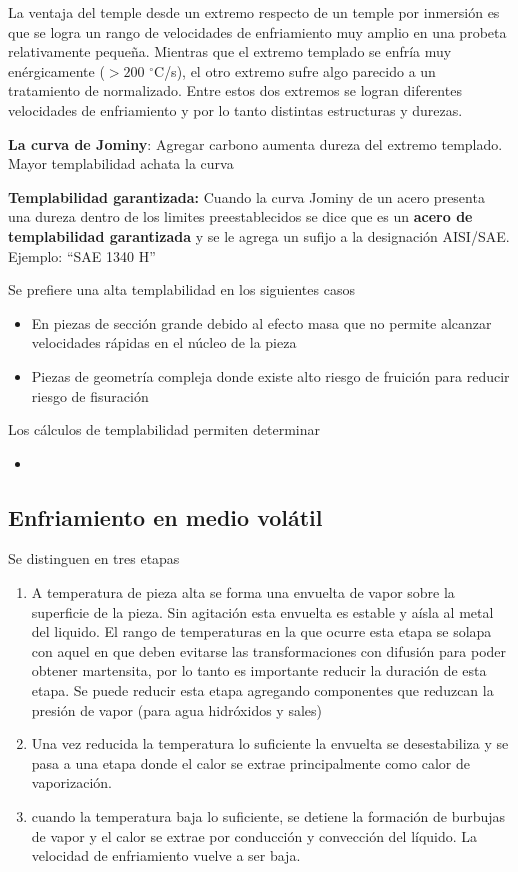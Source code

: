 \documentclass{article}
\newcommand{\grad}{\ensuremath{^\circ \mathrm{C}}}
\begin{document}
La ventaja del temple desde un extremo respecto de un temple por inmersión es que se logra un rango de velocidades de enfriamiento muy amplio en una probeta relativamente pequeña. Mientras que el extremo templado se enfría muy enérgicamente ($>200$ \grad/s), el otro extremo sufre algo parecido a un tratamiento de normalizado. Entre estos dos extremos se logran diferentes velocidades de enfriamiento y por lo tanto distintas estructuras y durezas.

\textbf{La curva de Jominy}: Agregar carbono aumenta dureza del extremo templado. Mayor templabilidad achata la curva

\textbf{Templabilidad garantizada:} Cuando la curva Jominy de un acero presenta una dureza dentro de los limites preestablecidos se dice que es un \textbf{acero de templabilidad garantizada} y se le agrega un sufijo a la designación AISI/SAE. Ejemplo: ``SAE 1340 H'' 


Se prefiere una alta templabilidad en los siguientes casos
\begin{itemize}
    \item En piezas de sección grande debido al efecto masa que no permite alcanzar velocidades rápidas en el núcleo de la pieza
    \item Piezas de geometría compleja donde existe alto riesgo de fruición para reducir riesgo de fisuración
\end{itemize}

Los cálculos de templabilidad permiten determinar 

\begin{itemize}
    \item 
\end{itemize}



\subsection{Enfriamiento en medio volátil}
Se distinguen en tres etapas
\begin{enumerate}[label=(\Alph*)]
    \item A temperatura de pieza alta se forma una envuelta de vapor sobre la superficie de la pieza. Sin agitación esta envuelta es estable y aísla al metal del liquido. El rango de temperaturas en la que ocurre esta etapa se solapa con aquel en que deben evitarse las transformaciones con difusión para poder obtener martensita, por lo tanto es importante reducir la duración de esta etapa. Se puede reducir esta etapa agregando componentes que reduzcan la presión de vapor (para agua hidróxidos y sales)
    \item Una vez reducida la temperatura lo suficiente la envuelta se desestabiliza y se pasa a una etapa donde el calor se extrae principalmente como calor de vaporización.
    \item cuando la temperatura baja lo suficiente, se detiene la formación de burbujas de vapor y el calor se extrae por conducción y convección del líquido. La velocidad de enfriamiento vuelve a ser baja.
\end{enumerate}
\end{document}
